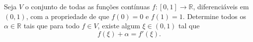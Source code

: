 Seja \(V\) o conjunto de todas as funções contínuas \(f\colon [0,1] \to \mathbb{R}\), diferenciáveis em \((0,1)\), com a propriedade de que \(f(0) = 0\) e \(f(1) = 1\). Determine todos os \(\alpha \in \mathbb{R}\) tais que para todo \(f \in V\), existe algum \(\xi \in (0,1)\) tal que
\[
f(\xi) + \alpha = f'(\xi).
\]
